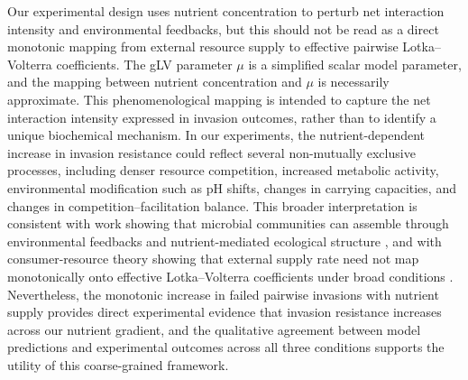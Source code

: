 Our experimental design uses nutrient concentration to perturb net interaction intensity and environmental feedbacks, but this should not be read as a direct monotonic mapping from external resource supply to effective pairwise Lotka--Volterra coefficients. The gLV parameter $\mu$ is a simplified scalar model parameter, and the mapping between nutrient concentration and $\mu$ is necessarily approximate. This phenomenological mapping is intended to capture the net interaction intensity expressed in invasion outcomes, rather than to identify a unique biochemical mechanism. In our experiments, the nutrient-dependent increase in invasion resistance could reflect several non-mutually exclusive processes, including denser resource competition, increased metabolic activity, environmental modification such as pH shifts, changes in carrying capacities, and changes in competition--facilitation balance. This broader interpretation is consistent with work showing that microbial communities can assemble through environmental feedbacks and nutrient-mediated ecological structure \citep{Goldford2018,Estrela2021}, and with consumer-resource theory showing that external supply rate need not map monotonically onto effective Lotka--Volterra coefficients under broad conditions \citep{DuanPawar2025}. Nevertheless, the monotonic increase in failed pairwise invasions with nutrient supply provides direct experimental evidence that invasion resistance increases across our nutrient gradient, and the qualitative agreement between model predictions and experimental outcomes across all three conditions supports the utility of this coarse-grained framework.

